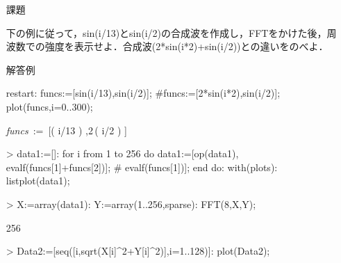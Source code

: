 \begin{itemize}
\item[課題]

下の例に従って，sin(i/13)とsin(i/2)の合成波を作成し，FFTをかけた後，周波数での強度を表示せよ．合成波(2*sin(i*2)+sin(i/2))との違いをのべよ．
\item[解答例]

\begin{MapleInput}
restart:
funcs:=[sin(i/13),sin(i/2)];
#funcs:=[2*sin(i*2),sin(i/2)];
plot(funcs,i=0..300);
\end{MapleInput}
\begin{MapleOutput}
{\it funcs}\, := \,[\sin \left( i/13 \right) ,2\,\sin \left( i/2 \right) ]
\end{MapleOutput}

\begin{MapleInput}
> data1:=[]:
for i from 1 to 256 do
  data1:=[op(data1),
   evalf(funcs[1]+funcs[2])]; 
#   evalf(funcs[1])]; 
end do:
with(plots): 
listplot(data1);
\end{MapleInput}

\begin{MapleInput}
> X:=array(data1): 
Y:=array(1..256,sparse):
FFT(8,X,Y);
\end{MapleInput}
\begin{MapleOutput}
256
\end{MapleOutput}

\begin{MapleInput}
> Data2:=[seq([i,sqrt(X[i]^2+Y[i]^2)],i=1..128)]:
plot(Data2);
\end{MapleInput}
\begin{MapleOutput}
\end{MapleOutput}

\end{itemize}
